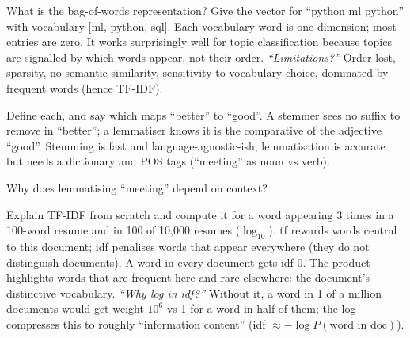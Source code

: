 \begin{qa}{ What is the bag-of-words representation? Give the vector for ``python ml python'' with vocabulary [ml, python, sql].}
\why Each vocabulary word is one dimension; most entries are zero. It works surprisingly well for topic classification because topics are signalled by
which words appear, not their order.
\pushes \emph{``Limitations?''} Order lost, sparsity, no semantic similarity, sensitivity to vocabulary choice, dominated by frequent words (hence TF-IDF).
\end{qa}

\begin{qa}{ Define each, and say which maps ``better'' to ``good''.}
\why A stemmer sees no suffix to remove in ``better''; a lemmatiser knows it is the comparative of the adjective ``good''. Stemming is fast and
language-agnostic-ish; lemmatisation is accurate but needs a dictionary and POS tags (``meeting'' as noun vs verb).
\end{qa}

\begin{qa}{ Why does lemmatising ``meeting'' depend on context?}
\end{qa}

\begin{qa}{Explain TF-IDF from scratch and compute it for a word appearing 3 times in a 100-word resume and in 100 of 10{,}000 resumes ($\log_{10}$).}
\why tf rewards words central to this document; idf penalises words that appear everywhere (they do not distinguish documents). A word in every document
gets idf 0. The product highlights words that are frequent here and rare elsewhere: the document's distinctive vocabulary.
\pushes \emph{``Why log in idf?''} Without it, a word in 1 of a million documents would get weight $10^6$ vs 1 for a word in half of them; the log
compresses this to roughly ``information content'' (idf $\approx -\log P(\text{word in doc})$).
\end{qa}

